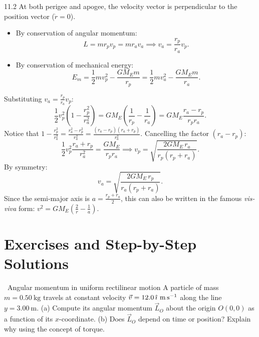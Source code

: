 \begin{solution}{11.2}
At both perigee and apogee, the velocity vector is perpendicular to the position vector ($\dot{r} = 0$).
\begin{itemize}[leftmargin=1.4em,itemsep=2pt]
  \item By conservation of angular momentum:
        \[
        L = m r_p v_p = m r_a v_a \implies v_a = \frac{r_p}{r_a}v_p.
        \]
  \item By conservation of mechanical energy:
        \[
        E_m = \frac{1}{2}mv_p^2 - \frac{GM_E m}{r_p} = \frac{1}{2}mv_a^2 - \frac{GM_E m}{r_a}.
        \]
\end{itemize}
Substituting $v_a = \frac{r_p}{r_a}v_p$:
\[
\frac{1}{2}v_p^2\left(1 - \frac{r_p^2}{r_a^2}\right) = GM_E\left(\frac{1}{r_p} - \frac{1}{r_a}\right) = GM_E\frac{r_a - r_p}{r_p r_a}.
\]
Notice that $1 - \frac{r_p^2}{r_a^2} = \frac{r_a^2 - r_p^2}{r_a^2} = \frac{(r_a - r_p)(r_a + r_p)}{r_a^2}$.
Cancelling the factor $(r_a - r_p)$:
\[
\frac{1}{2}v_p^2\frac{r_a + r_p}{r_a^2} = \frac{GM_E}{r_p r_a} \implies \boxed{v_p = \sqrt{\frac{2GM_E\,r_a}{r_p(r_p + r_a)}}.}
\]
By symmetry:
\[
\boxed{v_a = \sqrt{\frac{2GM_E\,r_p}{r_a(r_p + r_a)}}.}
\]
Since the semi-major axis is $a = \frac{r_p + r_a}{2}$, this can also be written in the famous \emph{vis-viva} form: $v^2 = GM_E\left(\frac{2}{r} - \frac{1}{a}\right)$.
\end{solution}

\section{Exercises and Step-by-Step Solutions}

\begin{exercise}{\warm\ Angular momentum in uniform rectilinear motion}
A particle of mass $m=0.50\ \mathrm{kg}$ travels at constant velocity $\vec{v} = 12.0\,\hat{\imath}\ \mathrm{m\,s^{-1}}$ along the line $y = 3.00\ \mathrm{m}$.
(a) Compute its angular momentum $\vec{L}_O$ about the origin $O(0,0)$ as a function of its $x$-coordinate.
(b) Does $\vec{L}_O$ depend on time or position? Explain why using the concept of torque.
\end{exercise}

\begin{tabletworkspace}[5.0cm]
\end{tabletworkspace}

